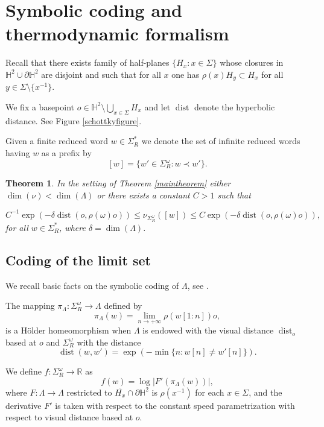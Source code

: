\documentclass{article}
\newtheorem{theorem}{Theorem}
\DeclareMathOperator{\dist}{dist}
\newcommand{\R}{\mathbb{R}}
\renewcommand{\H}{\mathbb{H}}
\begin{document}
\section{Symbolic coding and thermodynamic formalism}

Recall that there exists family of half-planes \(\lbrace H_x: x \in \Sigma\rbrace\) whose closures in \(\H^2 \cup \partial \H^2\) are disjoint and such that for all \(x\) one has \(\rho(x)H_y \subset H_x\) for all \(y \in \Sigma \setminus \lbrace x^{-1}\rbrace\).

We fix a basepoint \(o \in \H^2 \setminus \bigcup\limits_{x \in \Sigma}H_x\) and let \(\dist\) denote the hyperbolic distance.   See Figure \ref{schottkyfigure}.

Given a finite reduced word \(w \in \Sigma^*_R\) we denote the set of infinite reduced words having \(w\) as a prefix by
\[[w] = \lbrace w' \in \Sigma^\omega_R: w \prec w'\rbrace.\]

\begin{theorem}\label{dimdropalternativetheorem}
 In the setting of Theorem \ref{maintheorem} either \(\dim(\nu) < \dim(\Lambda)\) or there exists a constant \(C > 1\) such that
 
 \[C^{-1}\exp(-\delta \dist(o,\rho(\omega)o)) \le \nu_{\Sigma^\omega_R}\left([w]\right) \le C\exp(-\delta \dist(o,\rho(\omega)o)),\] 
 for all \(w \in \Sigma^{*}_R\), where \(\delta = \dim(\Lambda)\).
\end{theorem}

\subsection{Coding of the limit set}

We recall basic facts on the symbolic coding of \(\Lambda\), see \cite[Section 9]{lalley2}.

The mapping \(\pi_{\Lambda}:\Sigma^\omega_R \to \Lambda\) defined by
\[\pi_\Lambda(w) = \lim\limits_{n \to +\infty}\rho(w[1:n])o,\]
is a Hölder homeomorphism when \(\Lambda\) is endowed with the visual distance \(\dist_o\) based at \(o\) and \(\Sigma_R^\omega\) with the distance 
\[\dist(w,w') = \exp\left(-\min\lbrace n: w[n] \neq w'[n]\rbrace\right).\]

We define \(f:\Sigma^\omega_R \to \R\) as
\[f(w) = \log|F'(\pi_\Lambda(w))|,\]
where \(F:\Lambda \to \Lambda\) restricted to \(\overline{H_x} \cap \partial \H^2\) is \(\rho(x^{-1})\) for each \(x \in \Sigma\), and the derivative \(F'\) is taken with respect to the constant speed parametrization with respect to visual distance based at \(o\).
\end{document}
